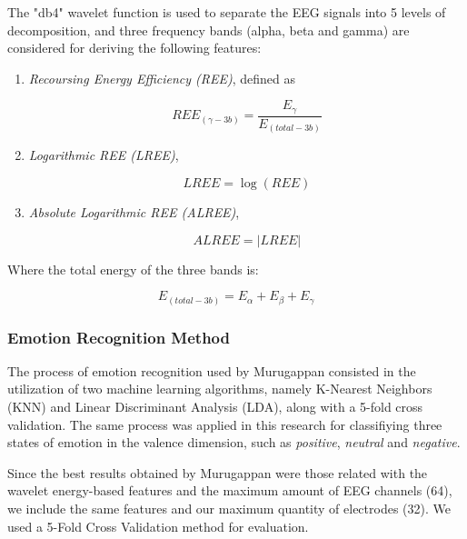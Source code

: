 \documentclass{sig-alternate}
\begin{document}
The "db4" wavelet function is used to separate the EEG signals into 5 levels of decomposition, and three frequency bands (alpha, beta and gamma) are considered for deriving the following features:

\begin{enumerate}
\item \textit{Recoursing Energy Efficiency (REE)}, defined as

\begin{equation}
REE_(\gamma-3b) = \frac{E_\gamma}{E_(total-3b)}
\end{equation}
\label{ec:ree}

\item \textit{Logarithmic REE (LREE)}, 

\begin{equation}
LREE = \log(REE)
\end{equation}
\label{ec:lree}

\item \textit{Absolute Logarithmic REE (ALREE)}, 

\begin{equation}
ALREE = \mathopen|LREE\mathclose|
\end{equation}
\label{ec:alree}


\end{enumerate}

Where the total energy of the three bands is:

\begin{equation}
E_(total-3b) = E_\alpha + E_\beta + E_\gamma
\end{equation}

\subsubsection{Emotion Recognition Method}

The process of emotion recognition used by Murugappan consisted in the utilization of two machine learning algorithms, namely K-Nearest Neighbors (KNN) and Linear Discriminant Analysis (LDA), along with a 5-fold cross validation. The same process was applied in this research for classifiying three states of emotion in the valence dimension, such as \emph{positive}, \emph{neutral} and \emph{negative}.

Since the best results obtained by Murugappan were those related with the wavelet energy-based features and the maximum amount of EEG channels (64), we include the same features and our maximum quantity of electrodes (32). We used a 5-Fold Cross Validation method for evaluation.
\end{document}
